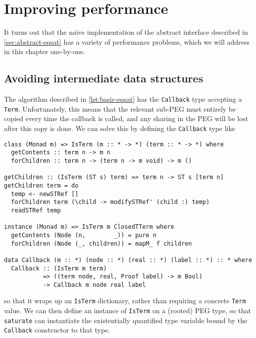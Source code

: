\documentclass[11pt]{report}
\newcommand{\haskell}[1]{\texttt{#1}}
\newcommand{\naive}[0]{{na\"{\i}ve}}
\begin{document}

\chapter{Improving performance}
\label{sec:improving-performance}

It turns out that the \naive{} implementation of the abstract interface
described in \autoref{sec:abstract-eqsat} has a variety of performance problems,
which we will address in this chapter one-by-one.

\section{Avoiding intermediate data structures}
\label{sec:avoiding-intermediates}

The algorithm described in \autoref{lst:basic-eqsat} has the \haskell{Callback}
type accepting a \haskell{Term}. Unfortunately, this means that the relevant
sub-PEG must entirely be copied every time the callback is called, and any
sharing in the PEG will be lost after this copy is done. We can solve this by
defining the \haskell{Callback} type like

\vspace{-0.5em}
\begin{verbatim}
class (Monad m) => IsTerm (m :: * -> *) (term :: * -> *) where
  getContents :: term n -> m n
  forChildren :: term n -> (term n -> m void) -> m ()

getChildren :: (IsTerm (ST s) term) => term n -> ST s [term n]
getChildren term = do
  temp <- newSTRef []
  forChildren term (\child -> modifySTRef' (child :) temp)
  readSTRef temp

instance (Monad m) => IsTerm m ClosedTTerm where
  getContents (Node (n,        _)) = pure n
  forChildren (Node (_, children)) = mapM_ f children

data Callback (m :: *) (node :: *) (real :: *) (label :: *) :: * where
  Callback :: (IsTerm m term)
           => ((term node, real, Proof label) -> m Bool)
           -> Callback m node real label
\end{verbatim}

so that it wraps up an \haskell{IsTerm} dictionary, rather than requiring a
concrete \haskell{Term} value. We can then define an instance
of \haskell{IsTerm} on a (rooted) PEG type, so that \haskell{saturate} can
instantiate the existentially quantified type variable bound by the
\haskell{Callback} constructor to that type.
\end{document}
